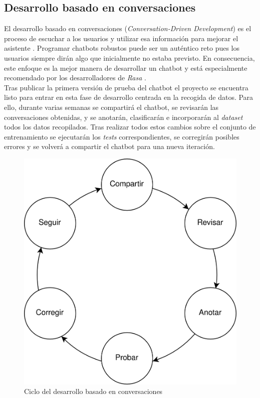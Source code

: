 \subsection{Desarrollo basado en conversaciones}
El desarrollo basado en conversaciones (\textit{Conversation-Driven Development}) es el proceso de escuchar a los usuarios y utilizar esa información para mejorar el asistente \cite{conversationDriven}. Programar chatbots robustos puede ser un auténtico reto pues los usuarios siempre dirán algo que inicialmente no estaba previsto. En consecuencia, este enfoque es la mejor manera de desarrollar un chatbot y está especialmente recomendado por los desarrolladores de \textit{Rasa} \cite{bestPracticesNLU}.\\

Tras publicar la primera versión de prueba del chatbot el proyecto se encuentra listo para entrar en esta fase de desarrollo centrada en la recogida de datos. Para ello, durante varias semanas se compartirá el chatbot, se revisarán las conversaciones obtenidas, y se anotarán, clasificarán e incorporarán al \textit{dataset} todos los datos recopilados. Tras realizar todos estos cambios sobre el conjunto de entrenamiento se ejecutarán los \textit{tests} correspondientes, se corregirán posibles errores y se volverá a compartir el chatbot para una nueva iteración.\\

\begin{figure}[htbp]
\centering
\includegraphics[scale=0.15]{../images/cdd.png} 
\caption{Ciclo del desarrollo basado en conversaciones}
\label{fig:cdd}
\end{figure}

